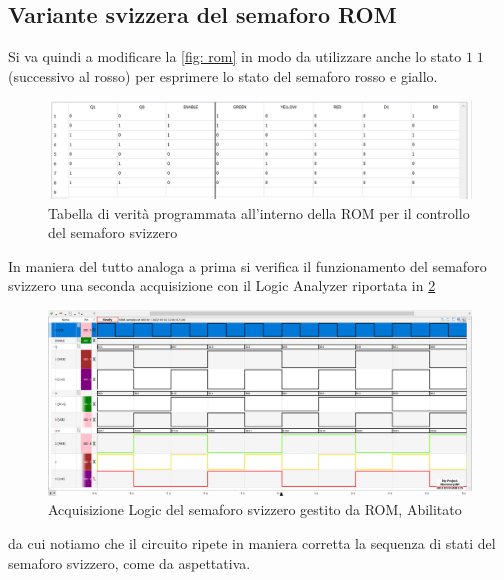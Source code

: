 \documentclass[10pt, a4paper, italian]{article}
\begin{document}
\subsection{Variante svizzera del semaforo ROM}
Si va quindi a modificare la \cref{fig: rom} in modo da utilizzare anche lo
stato $1\;1$ (successivo al rosso) per esprimere lo stato del semaforo
rosso e giallo.
\begin{figure}[htbp]
    \centering
    \includegraphics[width=\textwidth]{ROM.svizzero}
    \caption{Tabella di verità programmata all'interno della ROM per il
    controllo del semaforo svizzero
    \label{fig: rom.svizzero}}
\end{figure}

In maniera del tutto analoga a prima si verifica il funzionamento del semaforo
svizzero una seconda acquisizione con il Logic Analyzer riportata in
\cref{fig: es.2_svizzero}
\begin{figure}[htbp]
    \centering
    \includegraphics[width=\textwidth]{es2.svizzero}
    \caption{Acquisizione Logic del semaforo svizzero gestito da ROM, Abilitato
    \label{fig: es.2_svizzero}}
\end{figure}
da cui notiamo che il circuito ripete in maniera corretta la sequenza di stati
del semaforo svizzero, come da aspettativa.

\end{document}
